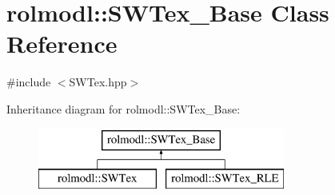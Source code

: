 \hypertarget{classrolmodl_1_1_s_w_tex___base}{}\section{rolmodl\+::S\+W\+Tex\+\_\+\+Base Class Reference}
\label{classrolmodl_1_1_s_w_tex___base}


{\ttfamily \#include $<$S\+W\+Tex.\+hpp$>$}

Inheritance diagram for rolmodl\+::S\+W\+Tex\+\_\+\+Base\+:\begin{figure}[H]
\begin{center}
\leavevmode
\includegraphics[height=2.000000cm]{classrolmodl_1_1_s_w_tex___base}
\end{center}
\end{figure}
